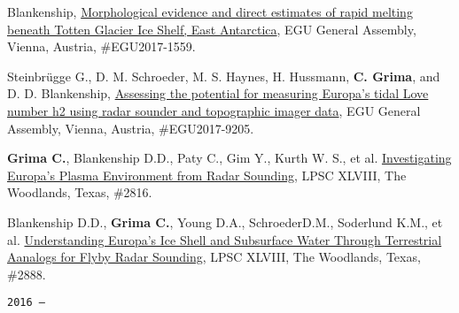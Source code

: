 \begin{etaremune}
  Blankenship,
  \href{http://meetingorganizer.copernicus.org/EGU2017/EGU2017-1559.pdf}{Morphological
  evidence and direct estimates of rapid melting beneath Totten Glacier
  Ice Shelf, East Antarctica}, EGU General Assembly, Vienna, Austria,
  \#EGU2017-1559.
\item
  Steinbrügge G., D. M. Schroeder, M. S. Haynes, H. Hussmann, \textbf{C.
  Grima}, and D. D. Blankenship,
  \href{http://meetingorganizer.copernicus.org/EGU2017/EGU2017-9205.pdf}{Assessing
  the potential for measuring Europa's tidal Love number h2 using radar
  sounder and topographic imager data}, EGU General Assembly, Vienna,
  Austria, \#EGU2017-9205.
\item
  \textbf{Grima C.}, Blankenship D.D., Paty C., Gim Y., Kurth W. S., et
  al.
  \href{http://www.lpi.usra.edu/meetings/lpsc2017/pdf/2816.pdf}{Investigating
  Europa's Plasma Environment from Radar Sounding}, LPSC XLVIII, The
  Woodlands, Texas, \#2816.
\item
  Blankenship D.D., \textbf{Grima C.}, Young D.A., SchroederD.M.,
  Soderlund K.M., et al.
  \href{http://www.lpi.usra.edu/meetings/lpsc2017/pdf/2888.pdf}{Understanding
  Europa's Ice Shell and Subsurface Water Through Terrestrial Aanalogs
  for Flyby Radar Sounding}, LPSC XLVIII, The Woodlands, Texas, \#2888.

\hspace{-2em}\texttt{2016 ---}


\end{etaremune}
